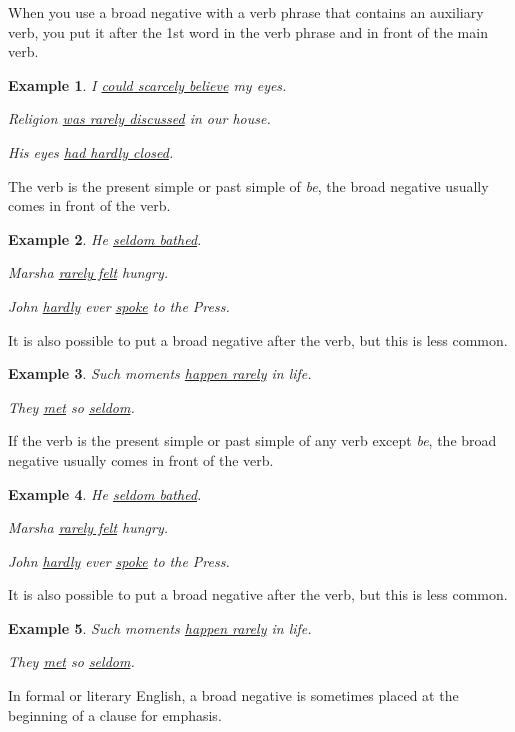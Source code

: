 \documentclass[oneside]{book}
\numberwithin{equation}{section}
\newtheorem{example}{Example}[section]
\begin{document}
%
\noindent{} When you use a broad negative with a verb phrase that contains an auxiliary verb, you put it after the 1st word in the verb phrase and in front of the main verb.
\begin{example}
    I \underline{could scarcely believe} my eyes.
    
    Religion \underline{was rarely discussed} in our house.
    
    His eyes \underline{had hardly closed}.
\end{example}
%
\noindent{} The verb is the present simple or past simple of \textit{be}, the broad negative usually comes in front of the verb.
\begin{example}
    He \underline{seldom bathed}.
    
    Marsha \underline{rarely felt} hungry.
    
    John \underline{hardly} ever \underline{spoke} to the Press.
\end{example}
It is also possible to put a broad negative after the verb, but this is less common.
\begin{example}
    Such moments \underline{happen rarely} in life.
    
    They \underline{met} so \underline{seldom}.
\end{example}
%
\noindent{} If the verb is the present simple or past simple of any verb except \textit{be}, the broad negative usually comes in front of the verb.
\begin{example}
    He \underline{seldom bathed}.
    
    Marsha \underline{rarely felt} hungry.
    
    John \underline{hardly} ever \underline{spoke} to the Press.
\end{example}
It is also possible to put a broad negative after the verb, but this is less common.
\begin{example}
    Such moments \underline{happen rarely} in life.
    
    They \underline{met} so \underline{seldom}.
\end{example}
%
\noindent{} In formal or literary English, a broad negative is sometimes placed at the beginning of a clause for emphasis.
\end{document}

